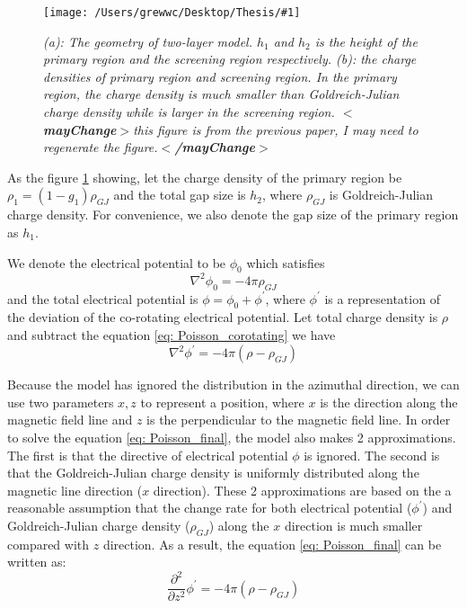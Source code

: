 \documentclass[12pt]{report}
\newcommand{\mycaption}[1]{\caption{\textit{\footnotesize #1}}}
\newcommand{\singleFig}[3]{
 \begin{figure}[!ht]
  \centering
  \texttt{[image: /Users/grewwc/Desktop/Thesis/\#1]}
  \mycaption{#3}
  \label{fig: #1}
 \end{figure} 
}
\newcommand{\gj}[0]{
  Goldreich-Julian charge density
}
\newcommand{\mayChange}[1]{
  $<$\textbf{mayChange}$>$#1$<$\textbf{/mayChange}$>$
}
\newcommand{\myComment}[1]{
  \newline
}
\begin{document}
          \singleFig{charge_density}{0.6}{(a): The geometry of two-layer model. $h_{1}$ and $h_{2}$ is the height
          of the primary region and the screening region respectively. (b): the charge densities of primary region and 
          screening region. In the primary region, the charge density is much smaller than Goldreich-Julian charge density
          while is larger in the screening region. \mayChange{this figure is from the previous paper, I may need to 
          regenerate the figure.}}
      
          As the figure \ref{fig: charge_density} showing, 
          let the charge density of the primary region be $\rho_1 = (1-g_{1}) \rho_{GJ}$ and the total gap size is 
          $h_{2}$, where $\rho_{GJ}$ is Goldreich-Julian charge density. For convenience, 
          we also denote the gap size of the primary region as $h_{1}$. 
          \myComment{Then we can calculate electric potential and electric field by solving the Poisson equation }

          We denote the electrical potential to be $\phi_{0}$ which satisfies 
          \begin{equation}
            \label{eq: Poisson_corotating}
            \nabla^{2}\phi_{0} = -4\pi\rho_{GJ}
          \end{equation}
          and the total electrical potential is $\phi = \phi_{0} + \phi^{\prime}$, where $\phi^{\prime}$ is a 
          representation of the deviation of the co-rotating electrical potential.  
          Let total charge density is $\rho$ and subtract the equation \ref{eq: Poisson_corotating} we have 
          \begin{equation}
            \label{eq: Poisson_final}
            \nabla^{2}\phi^{\prime} = -4\pi\left(\rho - \rho_{GJ} \right)
          \end{equation}

          Because the model has ignored the distribution in the azimuthal direction, we can use two parameters 
          $x, z$ to represent a position, where $x$ is the direction along the magnetic field line and $z$ is the 
          perpendicular to the magnetic field line. In order to solve the equation \ref{eq: Poisson_final}, 
          the model also makes 2 approximations. The first is that the directive of electrical potential $\phi$ 
          is ignored. The second is that the \gj{} is uniformly distributed along the magnetic line direction 
          ($x$ direction). These 2 approximations are based on the a reasonable assumption that the change rate 
          for both electrical potential ($\phi^{\prime}$) and \gj{}($\rho_{GJ}$) along the $x$ direction is much 
          smaller compared with $z$ direction. 
          As a result, the equation \ref{eq: Poisson_final} can be written as: 
          \begin{equation}
            \label{eq: Poisson_final_final}
            \frac{\partial^2}{\partial z^2} \phi^{\prime} = -4\pi\left(\rho - \rho_{GJ} \right)
          \end{equation}
\end{document}
